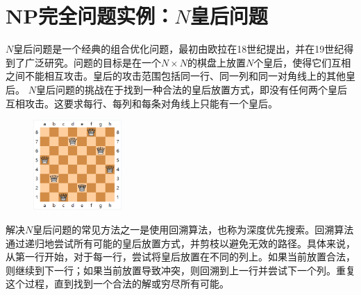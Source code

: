 \documentclass[UTF8,openany,zihao=5]{ctexbook}
\begin{document}
\section{NP完全问题实例：$N$皇后问题}

$N$皇后问题是一个经典的组合优化问题，最初由欧拉在18世纪提出，并在19世纪得到了广泛研究。问题的目标是在一个$N \times N$的棋盘上放置$N$个皇后，使得它们互相之间不能相互攻击。皇后的攻击范围包括同一行、同一列和同一对角线上的其他皇后。
$N$皇后问题的挑战在于找到一种合法的皇后放置方式，即没有任何两个皇后互相攻击。这要求每行、每列和每条对角线上只能有一个皇后。

\begin{figure}[H]
  \begin{center}
    \includegraphics[width=0.3\textwidth]{images/Chessboard480.svg.png}
    \centering
  \end{center}
  \vspace{-10pt}
\end{figure}

解决$N$皇后问题的常见方法之一是使用回溯算法，也称为深度优先搜索。回溯算法通过递归地尝试所有可能的皇后放置方式，并剪枝以避免无效的路径。具体来说，从第一行开始，对于每一行，尝试将皇后放置在不同的列上。如果当前放置合法，则继续到下一行；如果当前放置导致冲突，则回溯到上一行并尝试下一个列。重复这个过程，直到找到一个合法的解或穷尽所有可能。
\end{document}
